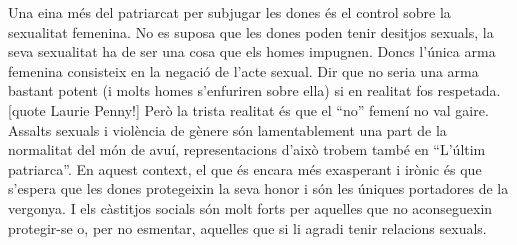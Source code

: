 \begin{comment}
Fuehlt sich nicht zugehoerig; die Frauen, die nie genuegen
----------------------------------------------------------
"La Laia havia dit: em penso que li agrades, a l'Arumí. Et mira d'una manera, cada cop que passem davant seu. Jo tenia clar que no podia agradar a ningú i encara menys a un d'aquí de tota la vida. Hi havia una premissa que m'explicava el món a pesar de les seves incongruències: als moros els agraden totes les dones, però especialment les mores. Als d'aquí, en canvi, no els havien d'agradar mai les mores. Era contranatural. Si no com s'explica que el pare amagués la seva dona de totes les mirades que no fossin cristianes?" (p.243)
-- fuehlt sich nicht zugehoerig

"Hi havia altres motius per creure que jo no podia agrada a ningú: 1) No havia tingut mai cap noviet a classe, cosa que havia passat amb la majoria de companyes a aquelles edats. 2) [...] ningú em feia mai cap petó [...] 3) La mare sempre em feia portar una trena llarga que ja semblava part del meu cos, els cabells ben enrere, duia ulleres i havia fet el canvi tan de pressa que semblava una geganta al costat dels meus companys d'escola, la mare de tots." (p.243-244)

"[...] havia dit a la Laia no em presentes la teva amiga, tan guapa que és? Jo vaig dir te'n fots o què? No, no, ho dic de debò, però sempre em va quedar el dubte perquè ho deia amb aquell mig somriure que fa ell." (p.244)
--fuehlt sich verarscht wenn sie andere menschen huebsch nennen; die frauen sind nie genug: genug jung, schoen, wuerdig fuer liebe

"Escolta, va dir un dia, vols sortir amb mi? Mira que n'ets, de cruel, li vaig dir i ell que no devia entendre res i jo encara vaig entendre-ho menys." (p.245)
\end{comment}

Una eina més del patriarcat per subjugar les dones és el control sobre la sexualitat femenina.
No es suposa que les dones poden tenir desitjos sexuals, la seva sexualitat ha de ser una cosa que els homes impugnen.
Doncs l'única arma femenina consisteix en la negació de l'acte sexual.
Dir que no seria una arma bastant potent (i molts homes s'enfuriren sobre ella) si en realitat fos respetada.[quote Laurie Penny!]
Però la trista realitat és que el ``no'' femení no val gaire.
Assalts sexuals i violència de gènere són lamentablement una part de la normalitat del món de avuí, representacions d'això trobem també en ``L'últim patriarca''.
En aquest context, el que és encara més exasperant i irònic és que s'espera que les dones protegeixin la seva honor i són les úniques portadores de la vergonya.
I els càstitjos socials són molt forts per aquelles que no aconseguexin protegir-se o, per no esmentar, aquelles que si li agradi tenir relacions sexuals.

